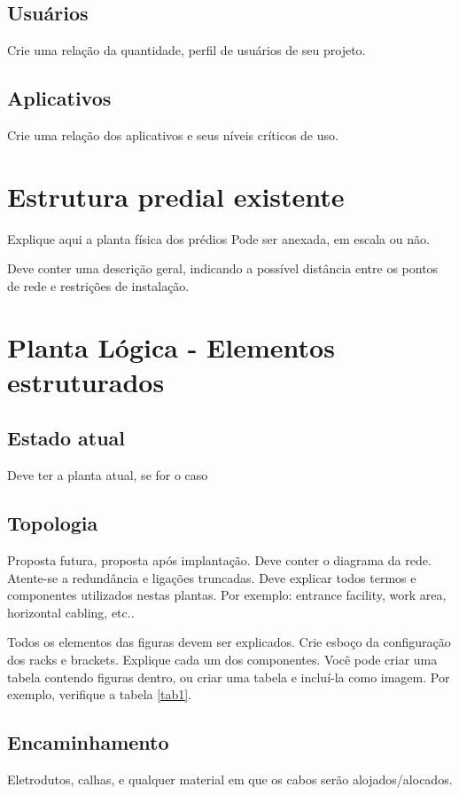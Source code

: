 \documentclass[	DIV=calc,%
							paper=a4,%
							fontsize=12pt,%
							onecolumn]{scrartcl}	 					%
\begin{document}
\subsection{Usuários}
Crie uma relação da quantidade, perfil de usuários de seu projeto.

\subsection{Aplicativos}
Crie uma relação dos aplicativos e seus níveis críticos de uso.


\section{Estrutura predial existente}

Explique aqui a planta física dos prédios
Pode ser anexada, em escala ou não.

Deve conter uma descrição geral, indicando a possível distância entre os pontos de rede e restrições de instalação.

\section{Planta Lógica - Elementos estruturados}

\subsection{Estado atual}
Deve ter a planta atual, se for o caso

\subsection{Topologia}
Proposta futura, proposta após implantação.
Deve conter o diagrama da rede. Atente-se a redundância  e ligações truncadas.
Deve explicar todos termos e componentes utilizados nestas plantas. Por exemplo: entrance facility, work area, horizontal cabling, etc..

Todos os elementos das figuras devem ser explicados. 
Crie esboço da configuração dos racks e brackets. Explique cada um dos componentes. Você pode criar uma tabela contendo figuras dentro, ou criar uma tabela e incluí-la como imagem. Por exemplo, verifique a tabela \ref{tab1}.



\subsection{Encaminhamento}
Eletrodutos, calhas, e qualquer material em que os cabos serão alojados/alocados.
\end{document}
